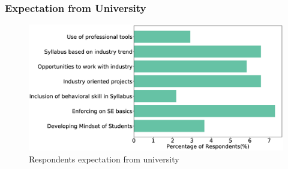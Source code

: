 \subsubsection{Expectation from University}
\label{Expectation from University}
\begin{figure}[htbp]
\includegraphics[scale=0.28]{Figures/UniversityExpectation.eps} 
\caption{Respondents expectation from university}
\label{fig:university expectation}
\end{figure}

